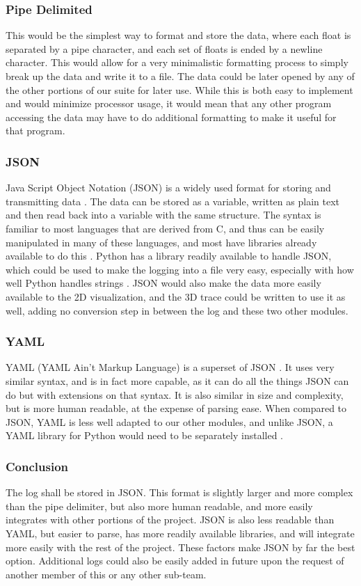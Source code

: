 \documentclass[onecolumn, draftclsnofoot,10pt, compsoc]{IEEEtran}
\begin{document}
\subsubsection{Pipe Delimited}
This would be the simplest way to format and store the data, where each float is separated by a pipe character, and each set of floats is ended by a newline character. This would allow for a very minimalistic formatting process to simply break up the data and write it to a file. The data could be later opened by any of the other portions of our suite for later use. While this is both easy to implement and would minimize processor usage, it would mean that any other program accessing the data may have to do additional formatting to make it useful for that program. 
\subsubsection{JSON}
Java Script Object Notation (JSON) is a widely used format for storing and transmitting data \cite{refjson}. The data can be stored as a variable, written as plain text and then read back into a variable with the same structure. The syntax is familiar to most languages that are derived from C, and thus can be easily manipulated in many of these languages, and most have libraries already available to do this \cite{refjson}. Python has a library readily available to handle JSON, which could be used to make the logging into a file very easy, especially with how well Python handles strings \cite{refpython}. JSON would also make the data more easily available to the 2D visualization, and the 3D trace could be written to use it as well, adding no conversion step in between the log and these two other modules.
\subsubsection{YAML}
YAML (YAML Ain’t Markup Language) is a superset of JSON \cite{refyaml}. It uses very similar syntax, and is in fact more capable, as it can do all the things JSON can do but with extensions on that syntax. It is also similar in size and complexity, but is more human readable, at the expense of parsing ease. When compared to JSON, YAML is less well adapted to our other modules, and unlike JSON, a YAML library for Python would need to be separately installed \cite{refyamlii}.
\subsubsection{Conclusion}
The log shall be stored in JSON. This format is slightly larger and more complex than the pipe delimiter, but also more human readable, and more easily integrates with other portions of the project. JSON is also less readable than YAML, but easier to parse, has more readily available libraries, and will integrate more easily with the rest of the project. These factors make JSON by far the best option. Additional logs could also be easily added in future upon the request of another member of this or any other sub-team\cite{refgs}.
\end{document}
